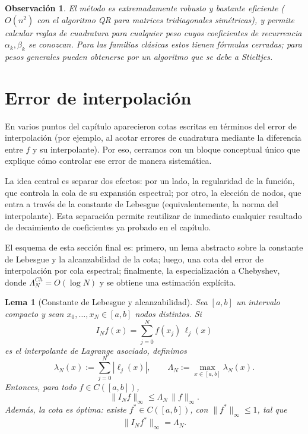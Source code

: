 \documentclass[a4paper,11pt]{report}
\newtheorem{lemma}[theorem]{Lema}
\newtheorem{remark}[theorem]{Observación}
\begin{document}
\begin{remark}
El método es extremadamente robusto y bastante eficiente ($O(n^2)$ con el algoritmo QR para matrices tridiagonales simétricas), y permite calcular reglas de cuadratura para cualquier peso cuyos coeficientes de recurrencia $\alpha_k, \beta_k$ se conozcan.  Para las familias clásicas estos tienen fórmulas cerradas; para pesos generales pueden obtenerse por un algoritmo que se debe a Stieltjes.
\end{remark}



\section{Error de interpolación}

En varios puntos del capítulo aparecieron cotas escritas en términos del error de interpolación (por ejemplo, al acotar errores de cuadratura mediante la diferencia entre $f$ y su interpolante). Por eso, cerramos con un bloque conceptual único que explique cómo controlar ese error de manera sistemática.

La idea central es separar dos efectos: por un lado, la regularidad de la función, que controla la cola de su expansión espectral; por otro, la elección de nodos, que entra a través de la constante de Lebesgue (equivalentemente, la norma del interpolante). Esta separación permite reutilizar de inmediato cualquier resultado de decaimiento de coeficientes ya probado en el capítulo.

El esquema de esta sección final es: primero, un lema abstracto sobre la constante de Lebesgue y la alcanzabilidad de la cota; luego, una cota del error de interpolación por cola espectral; finalmente, la especialización a Chebyshev, donde $\Lambda_N^{Ch}=O(\log N)$ y se obtiene una estimación explícita.


\begin{lemma}[Constante de Lebesgue y alcanzabilidad]\label{lem:lebesgue}
Sea $[a,b]$ un intervalo compacto y sean $x_0,\dots,x_N\in[a,b]$ nodos distintos. Si
\[
I_Nf(x)=\sum_{j=0}^N f(x_j)\,\ell_j(x)
\]
es el interpolante de Lagrange asociado, definimos
\[
\lambda_N(x):=\sum_{j=0}^N|\ell_j(x)|,
\qquad
\Lambda_N:=\max_{x\in[a,b]}\lambda_N(x).
\]
Entonces, para todo $f\in C([a,b])$,
\[
\|I_Nf\|_\infty\le \Lambda_N\,\|f\|_\infty.
\]
Además, la cota es óptima: existe $f^\ast\in C([a,b])$, con $\|f^\ast\|_\infty\le1$, tal que
\[
\|I_Nf^\ast\|_\infty=\Lambda_N.
\]
\end{lemma}
\end{document}
